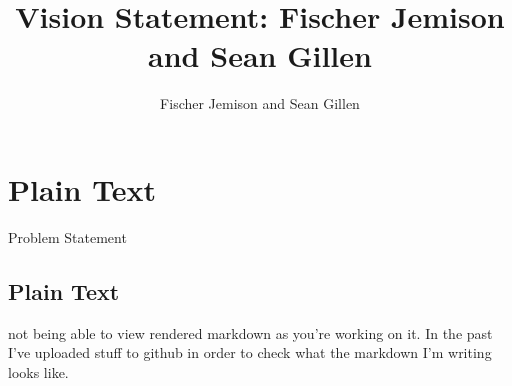 \documentclass[12pt]{article}
\title{Vision Statement: Fischer Jemison and Sean Gillen}
\author{Fischer Jemison and Sean Gillen}
\begin{document}
\maketitle
\tableofcontents


\section{Plain Text}
Problem Statement
\subsection{Plain Text}
not being able to view rendered markdown as you’re working on it. In the past I’ve uploaded stuff to github in order to check what the markdown I’m writing looks like.
%
%
%
%
%
%
%
\end{document}
